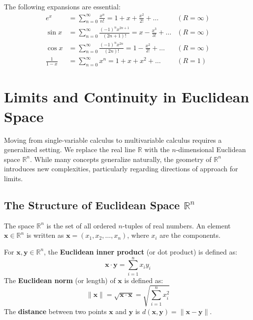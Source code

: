 \begin{example}
The following expansions are essential:
\begin{align*}
    e^x &= \sum_{n=0}^{\infty} \frac{x^n}{n!} = 1 + x + \frac{x^2}{2!} + \dots & (R = \infty) \\
    \sin x &= \sum_{n=0}^{\infty} \frac{(-1)^n x^{2n+1}}{(2n+1)!} = x - \frac{x^3}{3!} + \dots & (R = \infty) \\
    \cos x &= \sum_{n=0}^{\infty} \frac{(-1)^n x^{2n}}{(2n)!} = 1 - \frac{x^2}{2!} + \dots & (R = \infty) \\
    \frac{1}{1-x} &= \sum_{n=0}^{\infty} x^n = 1 + x + x^2 + \dots & (R = 1)
\end{align*}
\end{example}

\section{Limits and Continuity in Euclidean Space}

Moving from single-variable calculus to multivariable calculus requires a generalized setting. We replace the real line $\mathbb{R}$ with the $n$-dimensional Euclidean space $\mathbb{R}^n$. While many concepts generalize naturally, the geometry of $\mathbb{R}^n$ introduces new complexities, particularly regarding directions of approach for limits.

\subsection{The Structure of Euclidean Space $\mathbb{R}^n$}

The space $\mathbb{R}^n$ is the set of all ordered $n$-tuples of real numbers. An element $\mathbf{x} \in \mathbb{R}^n$ is written as $\mathbf{x} = (x_1, x_2, \dots, x_n)$, where $x_i$ are the components.

\begin{definition}
For $\mathbf{x}, \mathbf{y} \in \mathbb{R}^n$, the \textbf{Euclidean inner product} (or dot product) is defined as:
\[ \mathbf{x} \cdot \mathbf{y} = \sum_{i=1}^n x_i y_i \]
The \textbf{Euclidean norm} (or length) of $\mathbf{x}$ is defined as:
\[ \|\mathbf{x}\| = \sqrt{\mathbf{x} \cdot \mathbf{x}} = \sqrt{\sum_{i=1}^n x_i^2} \]
The \textbf{distance} between two points $\mathbf{x}$ and $\mathbf{y}$ is $d(\mathbf{x}, \mathbf{y}) = \|\mathbf{x} - \mathbf{y}\|$.
\end{definition}


